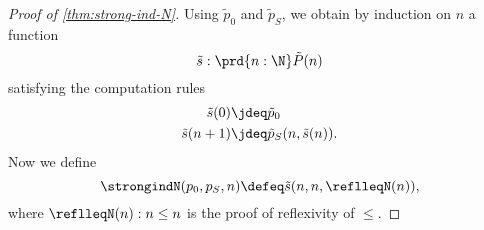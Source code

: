 \begin{proof}[Proof of \cref{thm:strong-ind-N}]
  Using $\tilde{p}_0$ and $\tilde{p}_S$, we obtain by induction on $n$ a function
  \begin{equation*}
    \tilde{s}:\prd{n:\N}\tilde{P}(n)
  \end{equation*}
  satisfying the computation rules
  \begin{align*}
    \tilde{s}(0) & \jdeq \tilde{p}_0 \\
    \tilde{s}(n+1) & \jdeq \tilde{p}_S(n,\tilde{s}(n)).
  \end{align*}
  Now we define
  \begin{equation*}
    \strongindN(p_0,p_S,n) \defeq \tilde{s}(n,n,\reflleqN(n)),
  \end{equation*}
  where $\reflleqN(n):n\leq n$ is the proof of reflexivity of $\leq$.


\end{proof}
